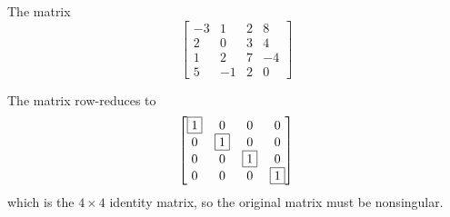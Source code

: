 \documentclass{ximera}
\begin{document}
\begin{exercise}
  The matrix
  \[
    \begin{bmatrix}
      -3 & 1 & 2 & 8\\
      2 & 0 & 3 & 4\\
      1 & 2 & 7 & -4\\
      5 & -1 & 2 & 0
    \end{bmatrix}
  \]
  \begin{multipleChoice}
  \end{multipleChoice}

  \begin{feedback}[correct]
    The matrix row-reduces to
    \[
      \begin{bmatrix}
        \fbox{1}&  0 &  0 &  0\\
        0 & \fbox{1} &  0 &  0\\
        0 &  0 & \fbox{1} &  0\\
        0 &  0 &  0 & \fbox{1}
      \end{bmatrix}
    \]
    which is the $4\times 4$ identity matrix, so the original matrix must be nonsingular.
  \end{feedback}
\end{exercise}
\end{document}
